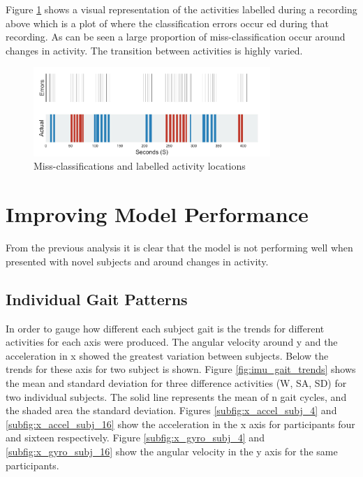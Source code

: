 \documentclass[sensors,article,submit,moreauthors,pdftex]{Definitions/mdpi}
\begin{document}
Figure \ref{fig:missclassification} shows a visual representation of the activities labelled during a recording above which is a plot of where the classification errors occur ed during that recording. As can be seen a large proportion of miss-classification occur around changes in activity. The transition between activities is highly varied.

\begin{figure}[!htb]
    \centering
    \includegraphics[width=0.8\textwidth]{Figures/results/location_of_errors.jpg}
    \caption{Miss-classifications and labelled activity locations}
    \label{fig:missclassification}
\end{figure}






\section{Improving Model Performance}
\label{sec:improving_perfromance} %
From the previous analysis it is clear that the model is not performing well when presented with novel subjects and around changes in activity.

\subsection{Individual Gait Patterns}
In order to gauge how different each subject gait is the trends for different activities for each axis were produced. The angular velocity around y and the acceleration in x showed the greatest variation between subjects. Below the trends for these axis for two subject is shown. Figure \ref{fig:imu_gait_trends} shows the mean and standard deviation for three difference activities (W, SA, SD) for two individual subjects. The solid line represents the mean of n gait cycles, and the shaded area the standard deviation. Figures \ref{subfig:x_accel_subj_4} and \ref{subfig:x_accel_subj_16} show the acceleration in the x axis for participants four and sixteen respectively. Figure \ref{subfig:x_gyro_subj_4} and \ref{subfig:x_gyro_subj_16} show the angular velocity in the y axis for the same participants.
\end{document}
